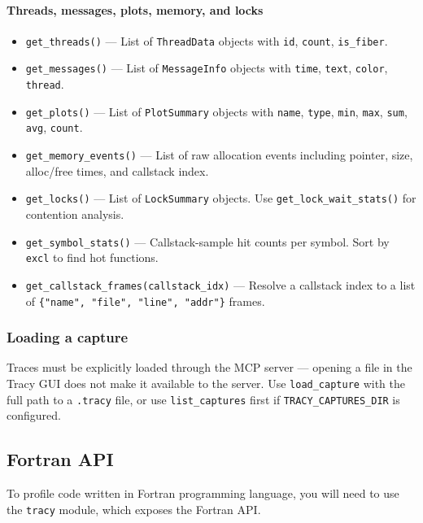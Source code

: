 \documentclass[hidelinks,titlepage,a4paper,twoside]{article}
\begin{document}
\paragraph{Threads, messages, plots, memory, and locks}
\begin{itemize}
\item \texttt{get\_threads()} --- List of \texttt{ThreadData} objects with \texttt{id}, \texttt{count}, \texttt{is\_fiber}.
\item \texttt{get\_messages()} --- List of \texttt{MessageInfo} objects with \texttt{time}, \texttt{text}, \texttt{color}, \texttt{thread}.
\item \texttt{get\_plots()} --- List of \texttt{PlotSummary} objects with \texttt{name}, \texttt{type}, \texttt{min}, \texttt{max}, \texttt{sum}, \texttt{avg}, \texttt{count}.
\item \texttt{get\_memory\_events()} --- List of raw allocation events including pointer, size, alloc/free times, and callstack index.
\item \texttt{get\_locks()} --- List of \texttt{LockSummary} objects. Use \texttt{get\_lock\_wait\_stats()} for contention analysis.
\item \texttt{get\_symbol\_stats()} --- Callstack-sample hit counts per symbol. Sort by \texttt{excl} to find hot functions.
\item \texttt{get\_callstack\_frames(callstack\_idx)} --- Resolve a callstack index to a list of \texttt{\{"name", "file", "line", "addr"\}} frames.
\end{itemize}

\subsubsection{Loading a capture}

Traces must be explicitly loaded through the MCP server — opening a file in the Tracy GUI does not make it available to the server. Use \texttt{load\_capture} with the full path to a \texttt{.tracy} file, or use \texttt{list\_captures} first if \texttt{TRACY\_CAPTURES\_DIR} is configured.

\subsection{Fortran API}
\label{fortranapi}

To profile code written in Fortran programming language, you will need to use the \texttt{tracy} module, which exposes the Fortran API.
\end{document}
